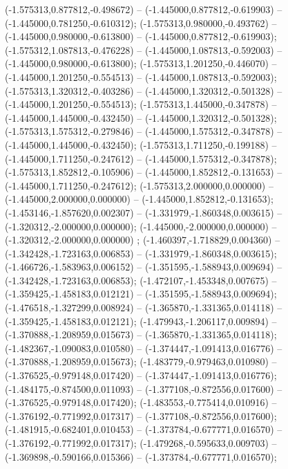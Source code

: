  (-1.575313,0.877812,-0.498672) -- (-1.445000,0.877812,-0.619903) -- (-1.445000,0.781250,-0.610312);
 (-1.575313,0.980000,-0.493762) -- (-1.445000,0.980000,-0.613800) -- (-1.445000,0.877812,-0.619903);
 (-1.575312,1.087813,-0.476228) -- (-1.445000,1.087813,-0.592003) -- (-1.445000,0.980000,-0.613800);
 (-1.575313,1.201250,-0.446070) -- (-1.445000,1.201250,-0.554513) -- (-1.445000,1.087813,-0.592003);
 (-1.575313,1.320312,-0.403286) -- (-1.445000,1.320312,-0.501328) -- (-1.445000,1.201250,-0.554513);
 (-1.575313,1.445000,-0.347878) -- (-1.445000,1.445000,-0.432450) -- (-1.445000,1.320312,-0.501328);
 (-1.575313,1.575312,-0.279846) -- (-1.445000,1.575312,-0.347878) -- (-1.445000,1.445000,-0.432450);
 (-1.575313,1.711250,-0.199188) -- (-1.445000,1.711250,-0.247612) -- (-1.445000,1.575312,-0.347878);
 (-1.575313,1.852812,-0.105906) -- (-1.445000,1.852812,-0.131653) -- (-1.445000,1.711250,-0.247612);
 (-1.575313,2.000000,0.000000) -- (-1.445000,2.000000,0.000000) -- (-1.445000,1.852812,-0.131653);
 (-1.453146,-1.857620,0.002307) -- (-1.331979,-1.860348,0.003615) -- (-1.320312,-2.000000,0.000000);
 (-1.445000,-2.000000,0.000000) -- (-1.320312,-2.000000,0.000000) ;
 (-1.460397,-1.718829,0.004360) -- (-1.342428,-1.723163,0.006853) -- (-1.331979,-1.860348,0.003615);
 (-1.466726,-1.583963,0.006152) -- (-1.351595,-1.588943,0.009694) -- (-1.342428,-1.723163,0.006853);
 (-1.472107,-1.453348,0.007675) -- (-1.359425,-1.458183,0.012121) -- (-1.351595,-1.588943,0.009694);
 (-1.476518,-1.327299,0.008924) -- (-1.365870,-1.331365,0.014118) -- (-1.359425,-1.458183,0.012121);
 (-1.479943,-1.206117,0.009894) -- (-1.370888,-1.208959,0.015673) -- (-1.365870,-1.331365,0.014118);
 (-1.482367,-1.090083,0.010580) -- (-1.374447,-1.091413,0.016776) -- (-1.370888,-1.208959,0.015673);
 (-1.483779,-0.979463,0.010980) -- (-1.376525,-0.979148,0.017420) -- (-1.374447,-1.091413,0.016776);
 (-1.484175,-0.874500,0.011093) -- (-1.377108,-0.872556,0.017600) -- (-1.376525,-0.979148,0.017420);
 (-1.483553,-0.775414,0.010916) -- (-1.376192,-0.771992,0.017317) -- (-1.377108,-0.872556,0.017600);
 (-1.481915,-0.682401,0.010453) -- (-1.373784,-0.677771,0.016570) -- (-1.376192,-0.771992,0.017317);
 (-1.479268,-0.595633,0.009703) -- (-1.369898,-0.590166,0.015366) -- (-1.373784,-0.677771,0.016570);
